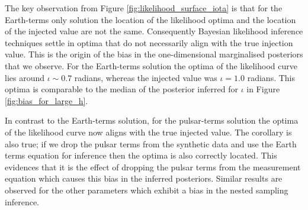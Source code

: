 \documentclass[fleqn,usenatbib,useAMS]{mnras}
\begin{document}
The key observation from Figure \ref{fig:likelihood_surface_iota} is that for the Earth-terms only solution the location of the likelihood optima and the location of the injected value are not the same. Consequently Bayesian likelihood inference techniques settle in optima that do not necessarily align with the true injection value. This is the origin of the bias in the one-dimensional marginalised posteriors that we observe.  For the Earth-terms solution the optima of the likelihood curve lies around $\iota \sim 0.7$ radians, whereas the injected value was $\iota = 1.0$ radians. This optima is comparable to the median of the posterior inferred for $\iota$ in Figure \ref{fig:bias_for_large_h}. \newline 

In contrast to the Earth-terms solution, for the pulsar-terms solution the optima of the likelihood curve now aligns with the true injected value. The corollary is also true; if we drop the pulsar terms from the synthetic data and use the Earth terms equation for inference then the optima is also correctly located. This evidences that it is the effect of dropping the pulsar terms from the measurement equation which causes this bias in the inferred posteriors. Similar results are observed for the other parameters which exhibit a bias in the nested sampling inference. \newline 
\end{document}
